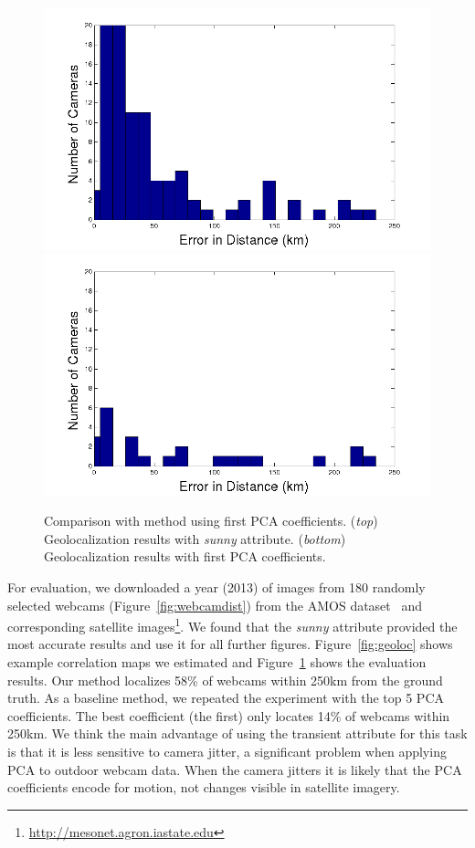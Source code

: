\documentclass[10pt,twocolumn,letterpaper]{article}
\newcommand{\figref}[1]{Figure~\ref{fig:#1}}
\begin{document}
\begin{figure}[t]
  \centering
  \includegraphics[width=.9\linewidth, trim= 20mm 0mm 20mm 0mm]{figs/geoloc/tran_errors}
  \includegraphics[width=.9\linewidth, trim= 20mm 0mm 20mm 0mm]{figs/geoloc/pca_errors}
  \caption{Comparison with method using first PCA coefficients. (\emph{top})
    Geolocalization results with \textit{sunny} attribute. (\emph{bottom})
    Geolocalization results with first PCA coefficients.}
  \label{fig:locerror}
\end{figure}

For evaluation, we downloaded a year (2013) of images from 180
randomly selected webcams (\figref{webcamdist}) from the AMOS
dataset~\cite{jacobs07amos} and corresponding satellite
images\footnote{\url{http://mesonet.agron.iastate.edu}}.  We found
that the \textit{sunny} attribute provided the most accurate results
and use it for all further figures. \figref{geoloc} shows example 
correlation maps we estimated and \figref{locerror}
shows the evaluation results. Our method localizes 58\% of webcams
within 250km from the ground truth. As a baseline method, we repeated
the experiment with the top 5 PCA coefficients. The best coefficient
(the first) only locates 14\% of webcams within 250km. We think
the main advantage of using the transient attribute for this task is
that it is less sensitive to camera jitter, a significant problem when
applying PCA to outdoor webcam data. When the camera jitters it is
likely that the PCA coefficients encode for motion, not changes
visible in satellite imagery.
\end{document}
